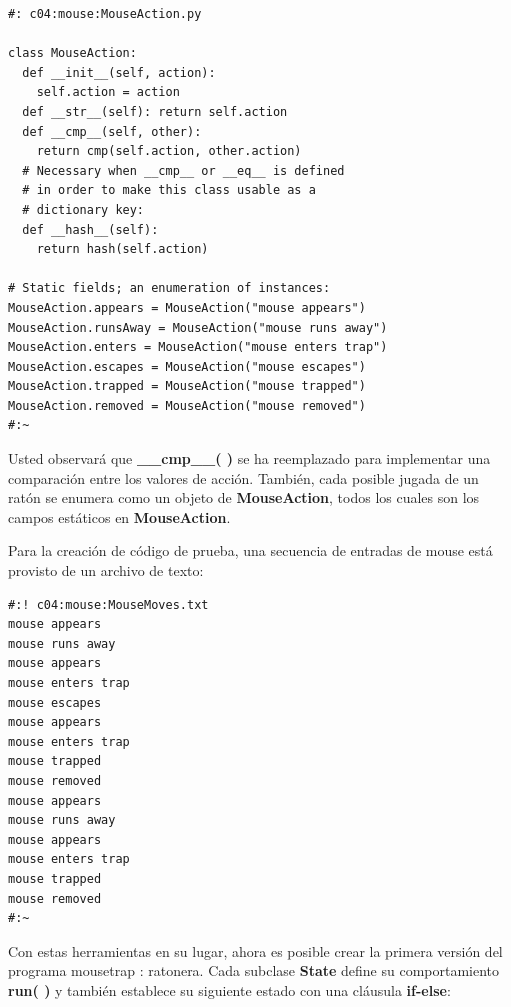 \documentclass{article}
\begin{document}
\begin{lstlisting}
#: c04:mouse:MouseAction.py 

class MouseAction: 
  def __init__(self, action):  
    self.action = action 
  def __str__(self): return self.action  
  def __cmp__(self, other): 
    return cmp(self.action, other.action) 
  # Necessary when __cmp__ or __eq__ is defined 
  # in order to make this class usable as a 
  # dictionary key: 
  def __hash__(self):  
    return hash(self.action) 
    
# Static fields; an enumeration of instances: 
MouseAction.appears = MouseAction("mouse appears") 
MouseAction.runsAway = MouseAction("mouse runs away") 
MouseAction.enters = MouseAction("mouse enters trap") 
MouseAction.escapes = MouseAction("mouse escapes") 
MouseAction.trapped = MouseAction("mouse trapped") 
MouseAction.removed = MouseAction("mouse removed") 
#:~   
  \end{lstlisting}
  
Usted observará que \textbf{\_\_cmp\_\_( )} se ha reemplazado para implementar una comparación entre los valores de acción. También, cada posible jugada de un ratón se enumera como un objeto de \textbf{MouseAction}, todos los cuales son los campos estáticos en \textbf{MouseAction}. \newline

Para la creación de código de prueba, una secuencia de entradas de mouse está provisto de un archivo de texto:  \newline
  
\begin{lstlisting}  
#:! c04:mouse:MouseMoves.txt 
mouse appears 
mouse runs away 
mouse appears 
mouse enters trap 
mouse escapes 
mouse appears 
mouse enters trap 
mouse trapped 
mouse removed 
mouse appears 
mouse runs away 
mouse appears 
mouse enters trap 
mouse trapped 
mouse removed 
#:~ 
\end{lstlisting}
 
 Con estas herramientas en su lugar, ahora es posible crear la primera versión del programa mousetrap : ratonera. Cada subclase \textbf{State} define su comportamiento \textbf{run( )} y también establece su siguiente estado con una cláusula \textbf{if-else}:   \newline
   
\end{document}
